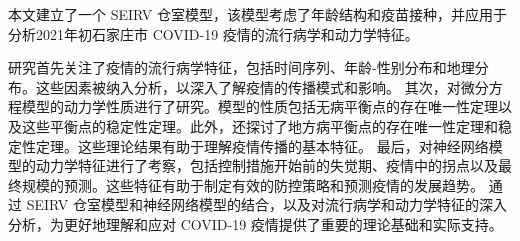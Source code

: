 \begin{conclusion}

	本文建立了一个 SEIRV 仓室模型，该模型考虑了年龄结构和疫苗接种，并应用于分析2021年初石家庄市 COVID-19 疫情的流行病学和动力学特征。

	研究首先关注了疫情的流行病学特征，包括时间序列、年龄-性别分布和地理分布。这些因素被纳入分析，以深入了解疫情的传播模式和影响。
	其次，对微分方程模型的动力学性质进行了研究。模型的性质包括无病平衡点的存在唯一性定理以及这些平衡点的稳定性定理。此外，还探讨了地方病平衡点的存在唯一性定理和稳定性定理。这些理论结果有助于理解疫情传播的基本特征。
	最后，对神经网络模型的动力学特征进行了考察，包括控制措施开始前的失觉期、疫情中的拐点以及最终规模的预测。这些特征有助于制定有效的防控策略和预测疫情的发展趋势。
	通过 SEIRV 仓室模型和神经网络模型的结合，以及对流行病学和动力学特征的深入分析，为更好地理解和应对 COVID-19 疫情提供了重要的理论基础和实际支持。
\end{conclusion}